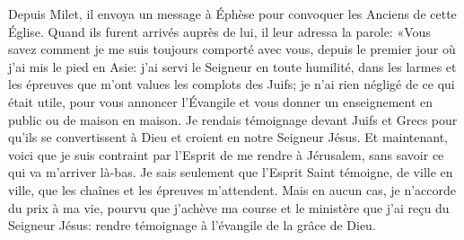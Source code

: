 Depuis Milet, il envoya un message à Éphèse
	pour convoquer les Anciens de cette Église.
Quand ils furent arrivés auprès de lui, il leur adressa la parole:
	«Vous savez comment je me suis toujours comporté avec vous,
	depuis le premier jour où j’ai mis le pied en Asie:
	j’ai servi le Seigneur en toute humilité,
	dans les larmes et les épreuves que m’ont values les complots des Juifs;
	je n’ai rien négligé de ce qui était utile, pour vous annoncer l’Évangile
	et vous donner un enseignement en public ou de maison en maison.
Je rendais témoignage devant Juifs et Grecs pour qu’ils se convertissent à Dieu
	et croient en notre Seigneur Jésus.
Et maintenant, voici que je suis contraint par l’Esprit de me rendre à Jérusalem,
	sans savoir ce qui va m’arriver là-bas.
Je sais seulement que l’Esprit Saint témoigne, de ville en ville,
	que les chaînes et les épreuves m’attendent.
Mais en aucun cas, je n’accorde du prix à ma vie,
	pourvu que j’achève ma course et le ministère que j’ai reçu du Seigneur Jésus:
	rendre témoignage à l’évangile de la grâce de Dieu.
